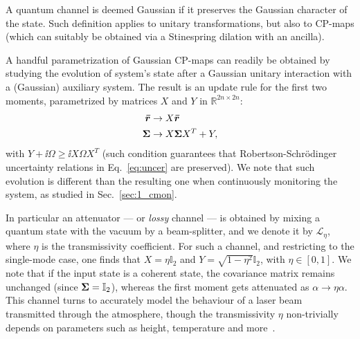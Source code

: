A quantum channel is deemed Gaussian if it preserves the Gaussian character of the state. Such definition applies to unitary transformations, but also to CP-maps (which can suitably be obtained via a Stinespring dilation with an ancilla).%


A handful parametrization of Gaussian CP-maps can readily be obtained by studying the evolution of system's state after a Gaussian unitary interaction with a (Gaussian) auxiliary system. The result is an update rule for the first two moments, parametrized by matrices $X$ and $Y$ in $\mathbb{R}^{2n\times2n}$:
\begin{align}\label{eq:1_cv_gaussianCPmap}
\bm{\bar{r}} &\rightarrow X \bm{\bar{r}}\\
\bm{\Sigma} &\rightarrow X \bm{\Sigma} X^T + Y,
\end{align}
with $Y + \ii \Omega \geq \ii X\Omega X^T$ (such condition guarantees that Robertson-Schrödinger uncertainty relations in Eq.~\eqref{eq:uncer} are preserved). We note that such evolution is different than the resulting one when continuously monitoring the system, as studied in Sec.~\ref{sec:1_cmon}.

In particular an attenuator --- or \textit{lossy} channel --- is obtained by mixing a quantum state with the vacuum by a beam-splitter, and we denote it by $\mathcal{L}_\eta$, where $\eta$ is the transmissivity coefficient. For such a channel, and restricting to the single-mode case, one finds that $X=\eta \mathbb{I}_2$ and $Y = \sqrt{1-\eta^2}\mathbb{I}_2$, with $\eta\in[0,1]$. We note that if the input state is a coherent state, the covariance matrix remains unchanged (since $\bm{\Sigma} = \mathbb{I}_2$), whereas the first moment gets attenuated as $\alpha \rightarrow \eta \alpha$. This channel turns to accurately model the behaviour of a laser beam transmitted through the atmosphere, though the transmissivity $\eta$ non-trivially depends on parameters such as height, temperature and
 more~\cite{Dequal2020,Andrews2005,Usenko2012a,Pirandola2021,Pirandola2021a,Vasylyev2011,Vasylyev2017}.
